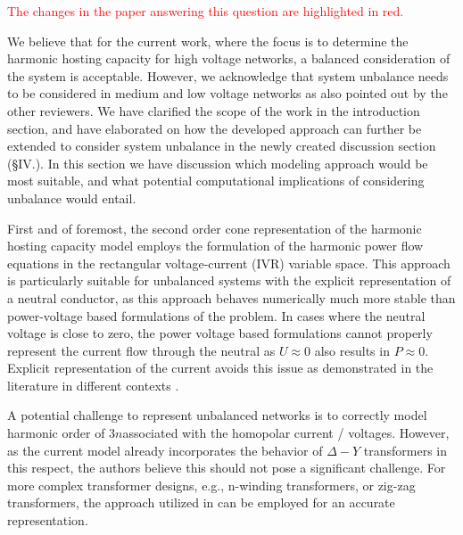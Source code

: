 \documentclass[10pt]{article}
\begin{document}
\begin{tcolorbox}[colback=black!5!white,colframe=black]

\textcolor{red}{The changes in the paper answering this question are highlighted in red.} \newline

We believe that for the current work, where the focus is to determine the harmonic hosting capacity for high voltage networks, a balanced consideration of the system is acceptable. However, we acknowledge that system unbalance needs to be considered in medium and low voltage networks as also pointed out by the other reviewers. We have clarified the scope of the work in the introduction section, and have elaborated on how the developed approach can further be extended to consider system unbalance in the newly created discussion section (\S IV.). In this section we have discussion which modeling approach would be most suitable, and what potential computational implications of considering unbalance would entail. 

First and of foremost, the second order cone representation of the harmonic hosting capacity model employs the formulation of the harmonic power flow equations in the rectangular voltage-current (IVR) variable space. This approach is particularly suitable for unbalanced systems with the explicit representation of a neutral conductor, as this approach behaves numerically much more stable than power-voltage based formulations of the problem. In cases where the neutral voltage is close to zero, the power voltage based formulations cannot properly represent the current flow through the neutral as $U \approx 0$ also results in $P \approx 0 $. Explicit representation of the current avoids this issue as demonstrated in the literature in different contexts \cite{claeys_applications_2021, jat_hybrid_2024}.

A potential challenge to represent unbalanced networks is to correctly model harmonic order of $3n$associated with the homopolar current / voltages. However, as the current model already incorporates the behavior of $\Delta - Y$ transformers in this respect, the authors believe this should not pose a significant challenge. For more complex transformer designs, e.g., n-winding transformers, or zig-zag transformers, the approach utilized in \cite{claeys_decomposition_2020} can be employed for an accurate representation.


\end{tcolorbox}
\end{document}
